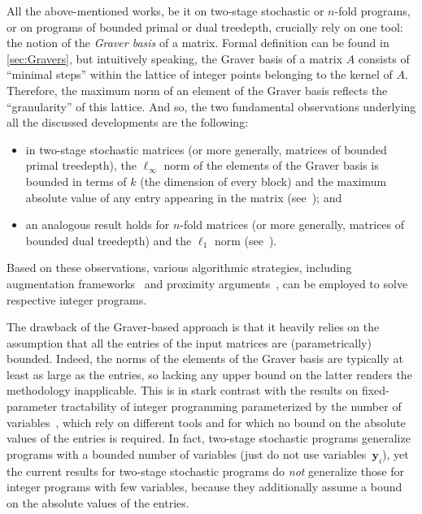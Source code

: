 \documentclass{article}
\newcommand{\tup}[1]{{\mathbf{#1}}}
\newcommand{\yy}{\tup y}
\begin{document}
All the above-mentioned works, be it on two-stage stochastic or $n$-fold programs, or on programs of bounded primal or dual treedepth, crucially rely on one tool: the notion of the {\em{Graver basis}} of a matrix. Formal definition can be found in \cref{sec:Gravers}, but intuitively speaking, the Graver basis of a matrix $A$ consists of ``minimal steps'' within the lattice of integer points belonging to the kernel of $A$. Therefore, the maximum norm of an element of the Graver basis reflects the ``granularity'' of this lattice. And so, the two fundamental observations underlying all the discussed developments are the following:
\begin{itemize}[nosep]
    \item in two-stage stochastic matrices (or more generally, matrices of bounded primal treedepth), the $\ell_\infty$ norm of the elements of the Graver basis is bounded in terms of $k$ (the dimension of every block) and the maximum absolute value of any entry appearing in the matrix (see~\cite[Lemma~28]{monster}); and
    \item an analogous result holds for $n$-fold matrices (or more generally, matrices of bounded dual treedepth) and the $\ell_1$ norm (see~\cite[Lemma~30]{monster}).
\end{itemize}
Based on these observations, various algorithmic strategies, including augmentation frameworks~\cite{JansenLR20,KouteckyLO18} and proximity arguments~\cite{CslovjecsekEHRW21,CslovjecsekEPVW21,EisenbrandHK18}, can be employed to solve respective integer programs.

The drawback of the Graver-based approach is that it heavily relies on the assumption that all the entries of the input matrices are (parametrically) bounded. Indeed, the norms of the elements of the Graver basis are typically at least as large as the entries, so lacking any upper bound on the latter renders the methodology inapplicable. This is in stark contrast with the results on fixed-parameter tractability of integer programming parameterized by the number of variables~\cite{Dadush12,DadushER23,FrankTardos1987,kannan1987minkowski,Lenstra1983,ReisR23}, which rely on different tools and for which no bound on the absolute values of the entries is required. In fact, two-stage stochastic programs generalize programs with a bounded number of variables (just do not use variables~$\yy_i$), yet the current results for two-stage stochastic programs do {\em{not}} generalize those for integer programs with few variables, because they additionally assume a bound on the absolute values of the entries.
\end{document}
